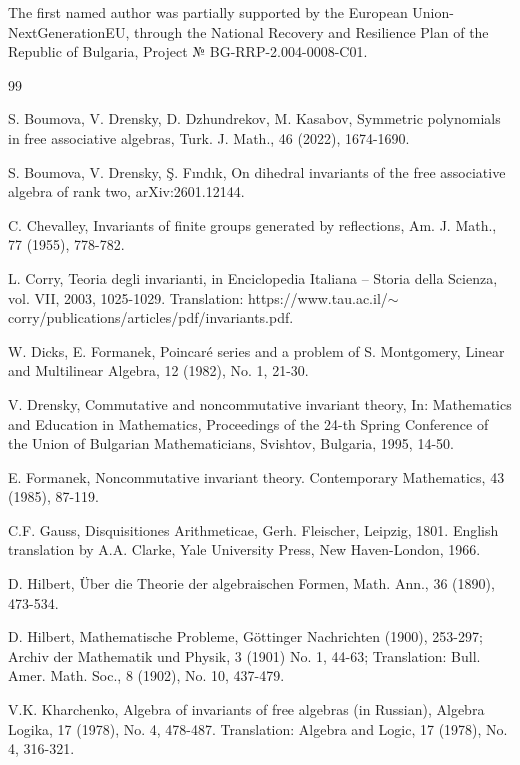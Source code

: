 \documentclass{amsart}
\theoremstyle{definition}
\begin{document}
The first named author was partially supported  by the European Union-NextGenerationEU,
through the National Recovery and Resilience Plan of the Republic of Bulgaria, Project № BG-RRP-2.004-0008-C01.


\begin{thebibliography}{99}

S. Boumova, V. Drensky, D. Dzhundrekov, M. Kasabov,
Symmetric polynomials in free associative algebras,
Turk. J. Math., 46 (2022), 1674-1690.

S. Boumova, V. Drensky, \c{S}. F{\i}nd{\i}k,
On dihedral invariants of the free associative algebra of rank two,
arXiv:2601.12144.

C. Chevalley,
Invariants of finite groups generated by reflections,
Am. J. Math., 77 (1955), 778-782.

L. Corry, Teoria degli invarianti, in Enciclopedia Italiana -- Storia della Scienza, vol. VII, 2003, 1025-1029.
Translation:
https://www.tau.ac.il/$\sim$corry/publications/articles/pdf/invariants.pdf.

W. Dicks, E. Formanek,
Poincar\'e series and a problem of S. Montgomery,
Linear and Multilinear Algebra, 12 (1982), No. 1, 21-30.

V. Drensky,
Commutative and noncommutative invariant theory,
In: Mathematics and Education in Mathematics,
Proceedings of the 24-th Spring Conference of the Union of Bulgarian Mathematicians, Svishtov, Bulgaria, 1995, 14-50.

E. Formanek,
Noncommutative invariant theory.
Contemporary Mathematics, 43 (1985), 87-119.

C.F. Gauss, Disquisitiones Arithmeticae, Gerh. Fleischer, Leipzig, 1801.
English translation by A.A. Clarke, Yale University Press, New Haven-London, 1966.

D. Hilbert,
\"Uber die Theorie der algebraischen Formen,
Math. Ann., 36 (1890), 473-534.

D. Hilbert,
Mathematische Probleme,
G\"ottinger Nachrichten (1900), 253-297;
Archiv der Mathematik und Physik, 3 (1901) No. 1, 44-63;
Translation: Bull. Amer. Math. Soc., 8 (1902), No. 10, 437-479.

V.K. Kharchenko,
Algebra of invariants of free algebras (in Russian),
Algebra Logika, 17 (1978), No. 4, 478-487.
Translation: Algebra and Logic, 17 (1978), No. 4, 316-321.


\end{thebibliography}
\end{document}
